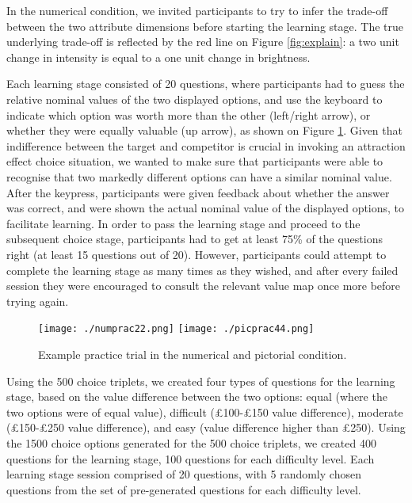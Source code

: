 \documentclass[11pt,a4paper]{article}
\begin{document}
In the numerical condition, we invited participants to try to infer the trade-off between the two attribute dimensions before starting the learning stage. The true underlying trade-off is reflected by the red line on Figure \ref{fig:explain}: a two unit change in intensity is equal to a one unit change in brightness.

Each learning stage consisted of 20 questions, where participants had to guess the relative nominal values of the two displayed options, and use the keyboard to indicate which option was worth more than the other (left/right arrow), or whether they were equally valuable (up arrow), as shown on Figure \ref{fig:practicetrial}. Given that indifference between the target and competitor is crucial in invoking an attraction effect choice situation, we wanted to make sure that participants were able to recognise that two markedly different options can have a similar nominal value. After the keypress, participants were given feedback about whether the answer was correct, and were shown the actual nominal value of the displayed options, to facilitate learning.
In order to pass the learning stage and proceed to the subsequent choice stage, participants had to get at least 75\% of the questions right (at least 15 questions out of 20). However, participants could attempt to complete the learning stage as many times as they wished, and after every failed session they were encouraged to consult the relevant value map once more before trying again. 


\begin{figure}[htp!]
\centering
\texttt{[image: ./numprac22.png]}
\texttt{[image: ./picprac44.png]}
\caption{Example practice trial in the numerical and pictorial condition.}
\label{fig:practicetrial}
\end{figure}


Using the 500 choice triplets, we created four types of questions for the learning stage, based on the value difference between the two options: equal (where the two options were of equal value), difficult (£100-£150 value difference), moderate (£150-£250 value difference), and easy (value difference higher than £250). Using the 1500 choice options generated for the 500 choice triplets, we created 400 questions for the learning stage, 100 questions for each difficulty level. Each learning stage session comprised of 20 questions, with 5 randomly chosen questions from the set of pre-generated questions for each difficulty level.
\end{document}
